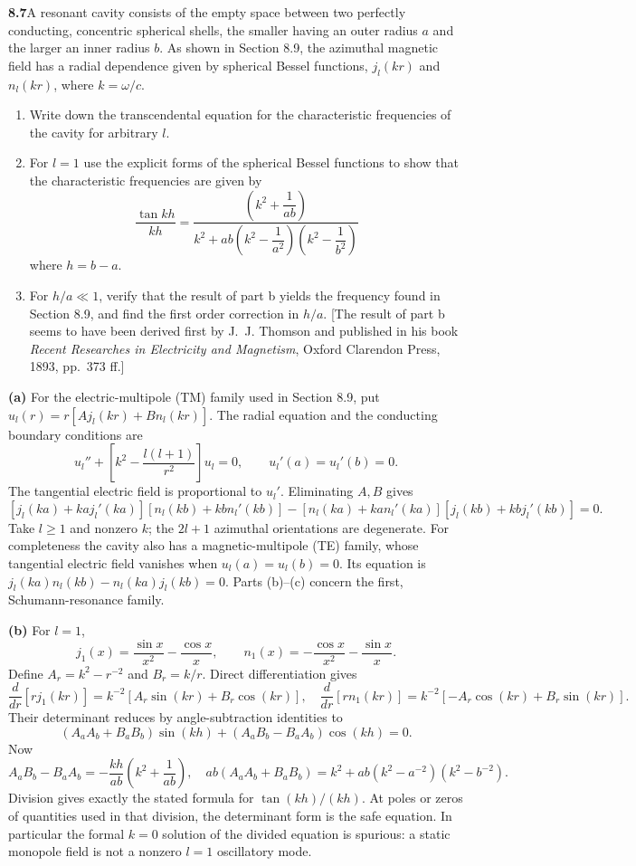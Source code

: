 \par\bigskip
\noindent\textbf{8.7}\quad A resonant cavity consists of the empty space between two perfectly conducting, concentric spherical shells, the smaller having an outer radius $a$ and the larger an inner radius $b$. As shown in Section 8.9, the azimuthal magnetic field has a radial dependence given by spherical Bessel functions, $j_{l}(kr)$ and $n_{l}(kr)$, where $k=\omega/c$.
\begin{enumerate}
\item[(a)] Write down the transcendental equation for the characteristic frequencies of the cavity for arbitrary $l$.
\item[(b)] For $l=1$ use the explicit forms of the spherical Bessel functions to show that the characteristic frequencies are given by
\[
\frac{\tan kh}{kh}=\frac{\left(k^{2}+\dfrac{1}{ab}\right)}{k^{2}+ab\left(k^{2}-\dfrac{1}{a^{2}}\right)\!\left(k^{2}-\dfrac{1}{b^{2}}\right)}
\]
where $h=b-a$.
\item[(c)] For $h/a\ll1$, verify that the result of part b yields the frequency found in Section 8.9, and find the first order correction in $h/a$. [The result of part b seems to have been derived first by J.~J. Thomson and published in his book \emph{Recent Researches in Electricity and Magnetism}, Oxford Clarendon Press, 1893, pp.~373 ff.]
\end{enumerate}
\solution

\textbf{(a)} For the electric-multipole (TM) family used in
Section 8.9, put
$u_l(r)=r[A j_l(kr)+B n_l(kr)]$.  The radial equation and the
conducting boundary conditions are
\[
u_l''+\left[k^2-\frac{l(l+1)}{r^2}\right]u_l=0,\qquad
u_l'(a)=u_l'(b)=0.
\]
The tangential electric field is proportional to $u_l'$.  Eliminating
$A,B$ gives
\[
\boxed{[j_l(ka)+ka j_l'(ka)][n_l(kb)+kb n_l'(kb)]
-[n_l(ka)+ka n_l'(ka)][j_l(kb)+kb j_l'(kb)]=0.}
\]
Take $l\geq1$ and nonzero $k$; the $2l+1$ azimuthal orientations
are degenerate.  For completeness the cavity also has a
magnetic-multipole (TE) family, whose tangential electric field
vanishes when $u_l(a)=u_l(b)=0$.  Its equation is
$j_l(ka)n_l(kb)-n_l(ka)j_l(kb)=0$.
Parts (b)--(c) concern the first, Schumann-resonance family.

\textbf{(b)} For $l=1$,
\[
j_1(x)=\frac{\sin x}{x^2}-\frac{\cos x}{x},\qquad
n_1(x)=-\frac{\cos x}{x^2}-\frac{\sin x}{x}.
\]
Define $A_r=k^2-r^{-2}$ and $B_r=k/r$.  Direct differentiation gives
\[
\frac d{dr}[rj_1(kr)]=k^{-2}[A_r\sin(kr)+B_r\cos(kr)],\quad
\frac d{dr}[rn_1(kr)]=k^{-2}[-A_r\cos(kr)+B_r\sin(kr)].
\]
Their determinant reduces by angle-subtraction identities to
\[
(A_aA_b+B_aB_b)\sin(kh)+(A_aB_b-B_aA_b)\cos(kh)=0.
\]
Now
\[
A_aB_b-B_aA_b=-\frac{kh}{ab}\left(k^2+\frac1{ab}\right),\quad
ab(A_aA_b+B_aB_b)=k^2+ab(k^2-a^{-2})(k^2-b^{-2}).
\]
Division gives exactly the stated formula for $\tan(kh)/(kh)$.
At poles or zeros of quantities used in that division, the determinant
form is the safe equation.  In particular the formal $k=0$ solution
of the divided equation is spurious: a static monopole field is not
a nonzero $l=1$ oscillatory mode.


